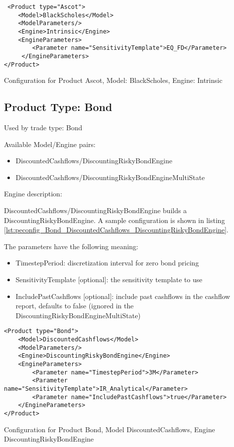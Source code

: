 \begin{longlisting}
\begin{verbatim}
 <Product type="Ascot">
    <Model>BlackScholes</Model>
    <ModelParameters/>
    <Engine>Intrinsic</Engine>
    <EngineParameters>
        <Parameter name="SensitivityTemplate">EQ_FD</Parameter>
     </EngineParameters>
</Product>
\end{verbatim}
\caption{Configuration for Product Ascot, Model: BlackScholes, Engine: Intrinsic}
\label{lst:peconfig_Ascot_BlackScholes_Intrinsic}
\end{longlisting}

\subsection{Product Type: Bond}

Used by trade type: Bond

Available Model/Engine pairs:

\begin{itemize}
\item DiscountedCashflows/DiscountingRiskyBondEngine
\item DiscountedCashflows/DiscountingRiskyBondEngineMultiState
\end{itemize}

Engine description:

DiscountedCashflows/DiscountingRiskyBondEngine builds a DiscountingRiskyBondEngine. A sample configuration is shown
in listing \ref{lst:peconfig_Bond_DiscountedCashflows_DiscountingRiskyBondEngine}.

The parameters have the following meaning:

\begin{itemize}
\item TimestepPeriod: discretization interval for zero bond pricing
\item SensitivityTemplate [optional]: the sensitivity template to use 
\item IncludePastCashflows [optional]: include past cashflows in the cashflow report, defaults to false (ignored in the DiscountingRiskyBondEngineMultiState)
\end{itemize}

\begin{longlisting}
\begin{verbatim}
<Product type="Bond">
    <Model>DiscountedCashflows</Model>
    <ModelParameters/>
    <Engine>DiscountingRiskyBondEngine</Engine>
    <EngineParameters>
        <Parameter name="TimestepPeriod">3M</Parameter>
        <Parameter name="SensitivityTemplate">IR_Analytical</Parameter>
        <Parameter name="IncludePastCashflows">true</Parameter>
    </EngineParameters>
</Product>
\end{verbatim}
\caption{Configuration for Product Bond, Model DiscountedCashflows, Engine DiscountingRiskyBondEngine}
\label{lst:peconfig_Bond_DiscountedCashflows_DiscountingRiskyBondEngine}
\end{longlisting}

